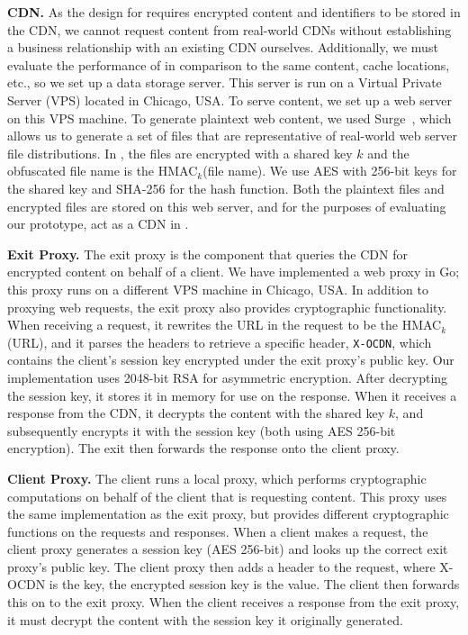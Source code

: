 \textbf{CDN.} As the design for \system{} requires encrypted content and identifiers
to be stored in the CDN, we cannot request content from real-world CDNs without
establishing a business relationship with an existing CDN ourselves. Additionally,
we must evaluate the performance of \system{} in comparison to the same content, cache locations, etc., so 
we set up a data storage server.  This server is run on a Virtual Private Server
(VPS) located in
Chicago, USA.  To serve content, we set up a web server on this VPS machine.  To generate 
plaintext web content, we used Surge~\cite{barford1998generating}, which allows us 
to generate a set of files that are representative of real-world web server file distributions.  
In \system{}, the files are encrypted with a shared key $k$ and the obfuscated file name is the 
HMAC$_{k}$(file name).  We use AES with 256-bit keys for the shared key and SHA-256
for the 
hash function.  Both the plaintext files and encrypted files are stored on this web server, and 
for the purposes of evaluating our prototype, act as a CDN in \system{}.

\textbf{Exit Proxy.} The exit proxy is the component that queries the CDN for
encrypted
content on behalf of a client.  We have implemented a web proxy in Go; this proxy
runs on
a different VPS machine in Chicago, USA.  In addition to proxying web requests, the exit 
proxy also provides cryptographic functionality.  When receiving a request, it rewrites
the URL in the request to be the HMAC$_{k}$(URL), and it parses the headers to retrieve a 
specific header, {\tt X-OCDN}, which contains the client's session key encrypted
under the exit
proxy's public key.  Our implementation uses 2048-bit RSA for asymmetric encryption.  After 
decrypting the session key, it stores it in memory for use on the response.  When 
it receives a response from the CDN, it decrypts the content with the shared key $k$, and 
subsequently encrypts it with the session key (both using AES 256-bit encryption).  The 
exit then forwards the response onto the client proxy.

\textbf{Client Proxy.} The client runs a local proxy, which performs cryptographic computations on behalf of the client that is
requesting
content.  This proxy uses the same implementation as the exit proxy, but provides 
different cryptographic functions on the requests and responses.  When a client makes 
a request, the client proxy generates a session key  (AES 256-bit) and looks up the correct exit proxy's 
public key.  The client proxy then adds a header to the request, 
where X-OCDN is the key, the encrypted session key is the value.  The client then forwards this on to the 
exit proxy.  When the client receives a response from the exit proxy, it must decrypt the content 
with the session key it originally generated.   
